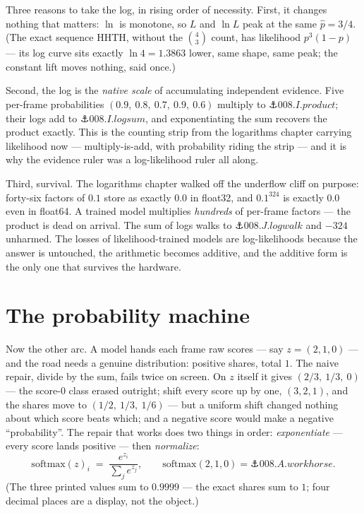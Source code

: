 \begin{narrative}
Three reasons to take the log, in rising order of necessity. First,
it changes nothing that matters: $\ln$ is monotone, so $L$ and
$\ln L$ peak at the same $\hat{p} = 3/4$. (The exact sequence HHTH,
without the $\binom{4}{3}$ count, has likelihood $p^3(1-p)$ — its log
curve sits exactly $\ln 4 = 1.3863$ lower, same shape, same peak; the
constant lift moves nothing, said once.)

Second, the log is the \emph{native scale} of accumulating
independent evidence. Five per-frame probabilities
$(0.9,\ 0.8,\ 0.7,\ 0.9,\ 0.6)$ multiply to
$\anchor{008.I.product}$; their logs add to
$\anchor{008.I.logsum}$, and exponentiating the sum recovers the
product exactly. This is the counting strip from the logarithms
chapter carrying likelihood now — multiply-is-add, with probability
riding the strip — and it is why the evidence ruler was a
log-likelihood ruler all along.

Third, survival. The logarithms chapter walked off the underflow
cliff on purpose: forty-six factors of $0.1$ store as exactly $0.0$
in float32, and $0.1^{324}$ is exactly $0.0$ even in float64. A
trained model multiplies \emph{hundreds} of per-frame factors — the
product is dead on arrival. The sum of logs walks to
$\anchor{008.J.logwalk}$ and $-324$ unharmed. The losses of
likelihood-trained models are log-likelihoods because the answer is
untouched, the arithmetic becomes additive, and the additive form is
the only one that survives the hardware.

\section{The probability machine}

Now the other arc. A model hands each frame raw scores — say
$z = (2, 1, 0)$ — and the road needs a genuine distribution: positive
shares, total $1$. The naive repair, divide by the sum, fails twice
on screen. On $z$ itself it gives $(2/3,\ 1/3,\ 0)$ — the score-$0$
class erased outright; shift every score up by one, $(3, 2, 1)$, and
the shares move to $(1/2,\ 1/3,\ 1/6)$ — but a uniform shift changed
nothing about which score beats which; and a negative score would
make a negative ``probability''. The repair that works does two
things in order: \emph{exponentiate} — every score lands positive —
then \emph{normalize}:
\[
  \mathrm{softmax}(z)_i \;=\; \frac{e^{z_i}}{\sum_j e^{z_j}},
  \qquad
  \mathrm{softmax}(2, 1, 0) = \anchor{008.A.workhorse}.
\]
(The three printed values sum to $0.9999$ — the exact shares sum to
$1$; four decimal places are a display, not the object.)


\end{narrative}
